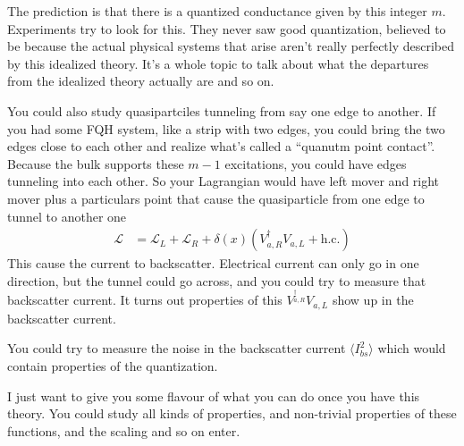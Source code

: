 The prediction is that there is a quantized conductance given by this integer
$m$.
Experiments try to look for this.
They never saw good quantization,
believed to be because the actual physical systems that arise
aren't really perfectly described by this idealized theory.
It's a whole topic to talk about what the departures from the idealized theory
actually are and so on.

You could also study quasipartciles tunneling from say one edge to another.
If you had some FQH system,
like a strip with two edges,
you could bring the two edges close to each other
and realize what's called a ``quanutm point contact''.
Because the bulk supports these $m-1$ excitations,
you could have edges tunneling into each other.
So your Lagrangian would have left mover and right mover
plus a particulars point that cause the quasiparticle from one edge
to tunnel to another one
\begin{align}
    \mathcal{L}
    &=
    \mathcal{L}_L
    + \mathcal{L}_R
    +
    \delta(x) \left( 
    V_{a,R}^\dagger V_{a,L} + \mathrm{h.c.}
    \right)
\end{align}
This cause the current to backscatter.
Electrical current can only go in one direction,
but the tunnel could go across,
and you could try to measure that backscatter current.
It turns out properties of this $V^_{a,R}^\dagger V_{a,L}$ show up in the
backscatter current.

You could try to measure the noise in the backscatter current
$\langle I_{bs}^2\rangle$
which would contain properties of the quantization.

I just want to give you some flavour of what you can do once you have this
theory.
You could study all kinds of properties,
and non-trivial properties of these functions,
and the scaling and so on enter.

